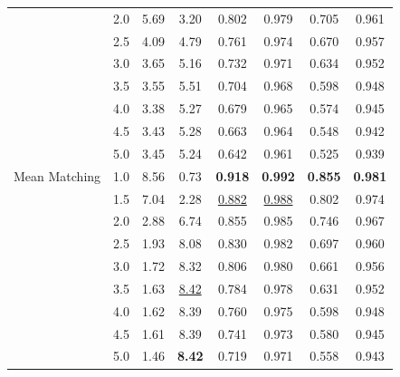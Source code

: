 \begin{table}[htbp]
\begin{tabular}{l|l|cccccc|}
 & 2.0 & 5.69 & 3.20 & 0.802 & 0.979 & 0.705 & 0.961 \\
 & 2.5 & 4.09 & 4.79 & 0.761 & 0.974 & 0.670 & 0.957 \\
 & 3.0 & 3.65 & 5.16 & 0.732 & 0.971 & 0.634 & 0.952 \\
 & 3.5 & 3.55 & 5.51 & 0.704 & 0.968 & 0.598 & 0.948 \\
 & 4.0 & 3.38 & 5.27 & 0.679 & 0.965 & 0.574 & 0.945 \\
 & 4.5 & 3.43 & 5.28 & 0.663 & 0.964 & 0.548 & 0.942 \\
 & 5.0 & 3.45 & 5.24 & 0.642 & 0.961 & 0.525 & 0.939 \\
\hline
Mean Matching & 1.0 & 8.56 & 0.73 & \textbf{0.918} & \textbf{0.992} & \textbf{0.855} & \textbf{0.981} \\
 & 1.5 & 7.04 & 2.28 & \underline{0.882} & \underline{0.988} & 0.802 & 0.974 \\
 & 2.0 & 2.88 & 6.74 & 0.855 & 0.985 & 0.746 & 0.967 \\
 & 2.5 & 1.93 & 8.08 & 0.830 & 0.982 & 0.697 & 0.960 \\
 & 3.0 & 1.72 & 8.32 & 0.806 & 0.980 & 0.661 & 0.956 \\
 & 3.5 & 1.63 & \underline{8.42} & 0.784 & 0.978 & 0.631 & 0.952 \\
 & 4.0 & 1.62 & 8.39 & 0.760 & 0.975 & 0.598 & 0.948 \\
 & 4.5 & 1.61 & 8.39 & 0.741 & 0.973 & 0.580 & 0.945 \\
 & 5.0 & 1.46 & \textbf{8.42} & 0.719 & 0.971 & 0.558 & 0.943 \\
\hline
\end{tabular}
\end{table}